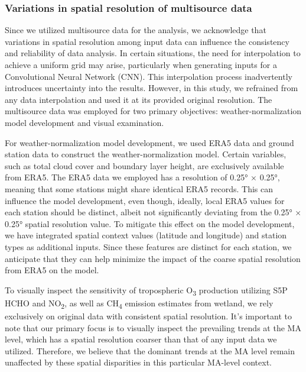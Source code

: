 \subsubsection{Variations in spatial resolution of multisource data}
Since we utilized multisource data for the analysis, we acknowledge that variations in spatial resolution among input data can influence the consistency and reliability of data analysis. In certain situations, the need for interpolation to achieve a uniform grid may arise, particularly when generating inputs for a Convolutional Neural Network (CNN). This interpolation process inadvertently introduces uncertainty into the results. However, in this study, we refrained from any data interpolation and used it at its provided original resolution. The multisource data was employed for two primary objectives: weather-normalization model development and visual examination. \par
For weather-normalization model development, we used ERA5 data and ground station data to construct the weather-normalization model. Certain variables, such as total cloud cover and boundary layer height, are exclusively available from ERA5. The ERA5 data we employed has a resolution of 0.25° × 0.25°, meaning that some stations might share identical ERA5 records. This can influence the model development, even though, ideally, local ERA5 values for each station should be distinct, albeit not significantly deviating from the 0.25° × 0.25° spatial resolution value. To mitigate this effect on the model development, we have integrated spatial context values (latitude and longitude) and station types as additional inputs. Since these features are distinct for each station, we anticipate that they can help minimize the impact of the coarse spatial resolution from ERA5 on the model. \par
To visually inspect the sensitivity of tropospheric O\textsubscript{3} production utilizing S5P HCHO and NO\textsubscript{2}, as well as CH\textsubscript{4} emission estimates from wetland, we rely exclusively on original data with consistent spatial resolution. It's important to note that our primary focus is to visually inspect the prevailing trends at the MA level, which has a spatial resolution coarser than that of any input data we utilized. Therefore, we believe that the dominant trends at the MA level remain unaffected by these spatial disparities in this particular MA-level context. \par

